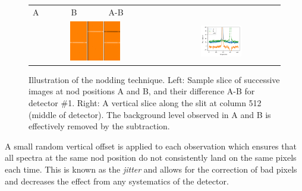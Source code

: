\begin{figure}
    \centering

      \begin{tabularx}{0.75\textwidth}{|*6{Y|}|}    %
      A & B & A-B& & & \\
         &
        \\
    \end{tabularx}
    \caption{Illustration of the nodding technique.
Left: Sample slice of successive images at nod positions A and B, and their difference A-B for detector \#1.
Right: A vertical slice along the slit at column 512 (middle of detector).
The background level observed in A and B is effectively removed by the subtraction.}
    \label{fig:nodimages}
\end{figure}

A small random vertical offset is applied to each observation which ensures that all spectra at the same nod position do not consistently land on the same pixels each time.
This is known as the \emph{jitter} and allows for the correction of bad pixels and decreases the effect from any systematics of the detector.



